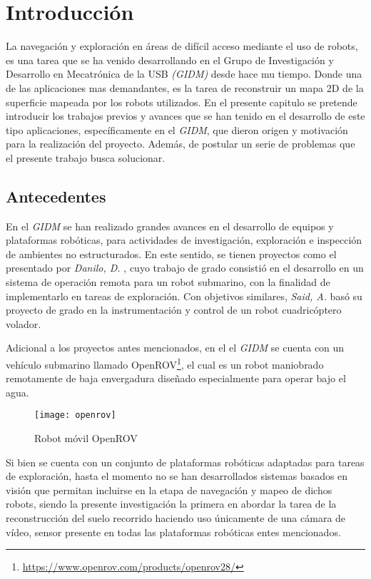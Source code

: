 \chapter{Introducción}
\label{capitulo1}

La navegación y exploración en áreas de difícil acceso mediante el uso de robots, es una tarea que se ha venido desarrollando en el Grupo de Investigación y Desarrollo en Mecatrónica de la USB  \textit{(GIDM)} desde hace mu tiempo. Donde una de las aplicaciones mas demandantes, es la tarea de reconstruir un mapa 2D de la superficie mapeada por los robots utilizados. En el presente capitulo se pretende introducir los trabajos previos y avances que se han tenido en el desarrollo de este tipo aplicaciones, específicamente en el \textit{GIDM}, que dieron origen y motivación para la realización del proyecto. Además, de postular un serie de problemas que el presente trabajo busca solucionar.

\section{Antecedentes}

En el \textit{GIDM} se han realizado grandes avances en el desarrollo de equipos y plataformas robóticas, para actividades de investigación, exploración e inspección de ambientes no estructurados. En este sentido, se tienen proyectos como el presentado por \textit{Danilo, D.} \cite{danilo}, cuyo trabajo de grado consistió en el desarrollo en un sistema de operación remota para un robot submarino, con la finalidad de implementarlo en tareas de exploración. Con objetivos similares, \textit{Said, A.} \cite{said} basó su proyecto de grado en la instrumentación y control de un robot cuadricóptero volador. 

Adicional a los proyectos antes mencionados, en el el \textit{GIDM}  se cuenta con un vehículo submarino llamado OpenROV\footnote{ \url{https://www.openrov.com/products/openrov28/}}, el cual es un robot maniobrado remotamente de baja envergadura diseñado especialmente para operar bajo el agua.

\begin{figure}[H]
	\centering
	\texttt{[image: openrov]}
	\caption{Robot móvil OpenROV}
	\label{imagen:openrov}
\end{figure}

Si bien se cuenta con un conjunto de plataformas robóticas adaptadas para tareas de exploración, hasta el momento no se han desarrollados sistemas basados en visión que permitan incluirse en la etapa de navegación y mapeo de dichos robots, siendo la presente investigación la primera en abordar la tarea de la reconstrucción del suelo recorrido haciendo uso únicamente de una cámara de vídeo, sensor presente en todas las plataformas robóticas entes mencionados.

